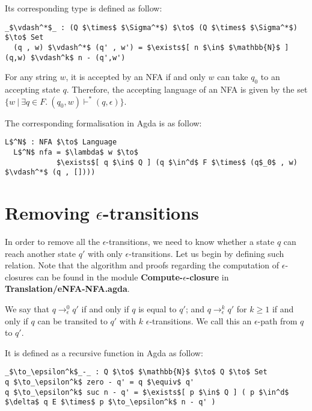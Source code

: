 \par Its corresponding type is defined as follow: 
\begin{lstlisting}[mathescape=true,xleftmargin=.1\textwidth]
  _$\vdash^*$_ : (Q $\times$ $\Sigma^*$) $\to$ (Q $\times$ $\Sigma^*$) $\to$ Set
  (q , w) $\vdash^*$ (q' , w') = $\exists$[ n $\in$ $\mathbb{N}$ ] (q,w) $\vdash^k$ n - (q',w')
\end{lstlisting}

\begin{defn}
\noindent For any string \(w\), it is accepted by an NFA
if and only \(w\) can take \(q_0\) to an accepting state \(q\). Therefore, the
accepting language of an NFA is given by the set \(\{w\ |\ \exists q\in F.\ (q_0,w) \vdash^* (q,\epsilon)\}\). 
\end{defn}

\par The corresponding formalisation in Agda is as follow: 
\begin{lstlisting}[mathescape=true,xleftmargin=.1\textwidth]
  L$^N$ : NFA $\to$ Language
  L$^N$ nfa = $\lambda$ w $\to$ 
            $\exists$[ q $\in$ Q ] (q $\in^d$ F $\times$ (q$_0$ , w) $\vdash^*$ (q , [])))
\end{lstlisting} 


\section{Removing \(\epsilon\)-transitions}
\par In order to remove all the \(\epsilon\)-transitions, we need to
know whether a state \(q\) can reach another state \(q'\) with only
\(\epsilon\)-transitions. Let us begin by defining such relation. Note that the algorithm and proofs regarding the
computation of \(\epsilon\)-closures can be found in the module
\textbf{Compute-\(\epsilon\)-closure} in
\textbf{Translation/eNFA-NFA.agda}. 

\begin{defn}
\noindent We say that
\(q \to_\epsilon^0 q'\) if and only if
\(q\) is equal to \(q'\); and \(q \to_\epsilon^k q'\) for \(k \geq
1\) if and only if \(q\) can be transited to \(q'\) with \(k\)
\(\epsilon\)-transitions. We call this an \(\epsilon\)-path from \(q\) to \(q'\).
\end{defn}

\par It is defined as a recursive function in Agda as follow:
\begin{lstlisting}[mathescape=true,xleftmargin=.1\textwidth]
_$\to_\epsilon^k$_-_ : Q $\to$ $\mathbb{N}$ $\to$ Q $\to$ Set
q $\to_\epsilon^k$ zero - q' = q $\equiv$ q'
q $\to_\epsilon^k$ suc n - q' = $\exists$[ p $\in$ Q ] ( p $\in^d$ $\delta$ q E $\times$ p $\to_\epsilon^k$ n - q' )
\end{lstlisting}

